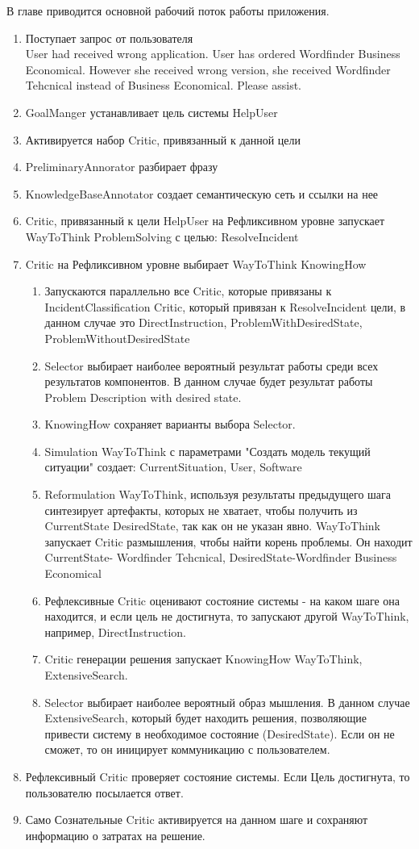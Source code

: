 В главе приводится основной рабочий поток работы приложения.
 \begin{enumerate}
	\item Поступает запрос от пользователя \\
	User had received wrong application.
User has ordered Wordfinder Business Economical.
However she received wrong version, she received Wordfinder Tehcnical instead of Business Economical. Please assist.
	\item GoalManger устанавливает цель системы HelpUser
	\item Активируется набор Critic, привязанный к данной цели
	\item PreliminaryAnnorator разбирает фразу
	\item KnowledgeBaseAnnotator создает семантическую сеть и ссылки на нее
	\item Critic, привязанный к цели HelpUser на Рефликсивном уровне запускает WayToThink ProblemSolving с целью: ResolveIncident
	\item Critic на Рефликсивном уровне выбирает WayToThink KnowingHow
	\begin{enumerate}
	\item Запускаются параллельно все Critic, которые привязаны к IncidentClassification Critic, который привязан к ResolveIncident цели, в данном случае это DirectInstruction, ProblemWithDesiredState, ProblemWithoutDesiredState
	\item Selector выбирает наиболее вероятный результат работы среди всех результатов компонентов. В данном случае будет результат работы Problem Description with desired state.
	\item KnowingHow сохраняет варианты выбора Selector.
	\item Simulation WayToThink с параметрами "Создать модель текущий ситуации" создает: CurrentSituation, User, Software
	\item Reformulation WayToThink, используя результаты предыдущего шага синтезирует артефакты, которых не хватает, чтобы получить из CurrentState DesiredState, так как он не указан явно. WayToThink запускает Critic размышления, чтобы найти корень проблемы. Он находит CurrentState- Wordfinder Tehcnical, DesiredState-Wordfinder Business Economical
	\item Рефлексивные Critic оценивают состояние системы - на каком шаге она находится, и если цель не достигнута, то запускают другой WayToThink, например, DirectInstruction. 
	\item Critic генерации решения запускает KnowingHow WayToThink, ExtensiveSearch.
	\item Selector выбирает наиболее вероятный образ мышления. В данном случае ExtensiveSearch, который будет находить решения, позволяющие привести систему в необходимое состояние (DesiredState). Если он не сможет, то он иницирует коммуникацию с пользователем. 
 \end{enumerate}
	 \item Рефлексивный Critic проверяет состояние системы. Если Цель достигнута, то пользователю посылается ответ.
	 \item Само Сознательные Critic активируется на данном шаге и сохраняют информацию о затратах на решение.

\end{enumerate}
